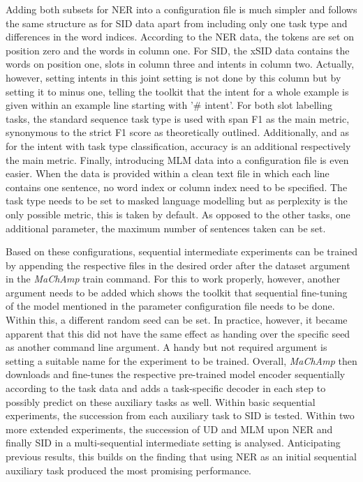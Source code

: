 \documentclass[11pt,a4paper,twoside,openright]{scrbook}
\begin{document}
Adding both subsets for NER into a configuration file is much simpler and follows the same structure as for SID data apart from including only one task type and differences in the word indices. According to the NER data, the tokens are set on position zero and the words in column one. For SID, the xSID data contains the words on position one, slots in column three and intents in column two. Actually, however, setting intents in this joint setting is not done by this column but by setting it to minus one, telling the toolkit that the intent for a whole example is given within an example line starting with '\# intent'. For both slot labelling tasks, the standard sequence task type is used with span F1 as the main metric, synonymous to the strict F1 score as theoretically outlined. Additionally, and as for the intent with task type classification, accuracy is an additional respectively the main metric. Finally, introducing MLM data into a configuration file is even easier. When the data is provided within a clean text file in which each line contains one sentence, no word index or column index need to be specified. The task type needs to be set to masked language modelling but as perplexity is the only possible metric, this is taken by default. As opposed to the other tasks, one additional parameter, the maximum number of sentences taken can be set.

Based on these configurations, sequential intermediate experiments can be trained by appending the respective files in the desired order after the dataset argument in the \textit{MaChAmp} train command. For this to work properly, however, another argument needs to be added which shows the toolkit that sequential fine-tuning of the model mentioned in the parameter configuration file needs to be done. Within this, a different random seed can be set. In practice, however, it became apparent that this did not have the same effect as handing over the specific seed as another command line argument. A handy but not required argument is setting a suitable name for the experiment to be trained. Overall, \textit{MaChAmp} then downloads and fine-tunes the respective pre-trained model encoder sequentially according to the task data and adds a task-specific decoder in each step to possibly predict on these auxiliary tasks as well. Within basic sequential experiments, the succession from each auxiliary task to SID is tested. Within two more extended experiments, the succession of UD and MLM upon NER and finally SID in a multi-sequential intermediate setting is analysed. Anticipating previous results, this builds on the finding that using NER as an initial sequential auxiliary task produced the most promising performance.
\end{document}
